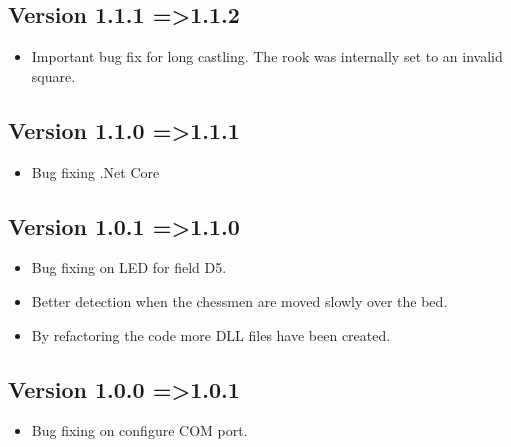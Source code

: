 \documentclass[11pt,a4paper]{article}
\begin{document}
\subsection{Version 1.1.1 =\textgreater 1.1.2}
\begin{itemize}
	\item Important bug fix for long castling. The rook was internally set to an invalid square.
\end{itemize}
\subsection{Version 1.1.0 =\textgreater 1.1.1}
\begin{itemize}
	\item Bug fixing .Net Core
\end{itemize}
\subsection{Version 1.0.1 =\textgreater 1.1.0}
\begin{itemize}
	\item Bug fixing on LED for field D5.
    \item Better detection when the chessmen are moved slowly over the bed.
    \item By refactoring the code more DLL files have been created.
\end{itemize}
\subsection{Version 1.0.0 =\textgreater 1.0.1}
\begin{itemize}
	\item Bug fixing on configure COM port.
\end{itemize}
\end{document}
